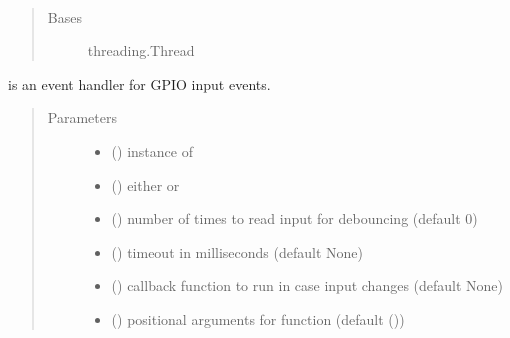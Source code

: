 \documentclass[letterpaper,10pt,english]{sphinxmanual}
\begin{document}

\begin{fulllineitems}
\label{\detokenize{index:rcpy.gpio.InputEvent}}~\begin{quote}\begin{description}
\item[{Bases}] \leavevmode
threading.Thread

\end{description}\end{quote}

{\hyperref[\detokenize{index:rcpy.gpio.InputEvent}]{}} is an event handler for GPIO input events.
\begin{quote}\begin{description}
\item[{Parameters}] \leavevmode\begin{itemize}
\item {} 
 () \textendash{} instance of {\hyperref[\detokenize{index:rcpy.gpio.Input}]{}}

\item {} 
 () \textendash{} either {\hyperref[\detokenize{index:rcpy.gpio.InputEvent.HIGH}]{}} or {\hyperref[\detokenize{index:rcpy.gpio.InputEvent.LOW}]{}}

\item {} 
 () \textendash{} number of times to read input for debouncing (default 0)

\item {} 
 () \textendash{} timeout in milliseconds (default None)

\item {} 
 () \textendash{} callback function to run in case input changes (default None)

\item {} 
 () \textendash{} positional arguments for function  (default ())


\end{itemize}
\end{description}
\end{quote}
\end{fulllineitems}
\end{document}
